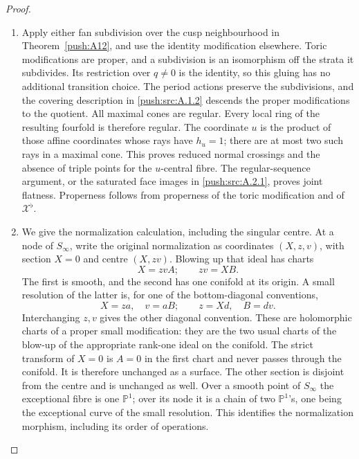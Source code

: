 \begin{proof}
\begin{enumerate}[label=\arabic*.,leftmargin=*]
\item Apply either fan subdivision over the cusp neighbourhood in
Theorem~\ref{push:A12}, and use the identity modification elsewhere.
Toric modifications are proper, and a subdivision is an
isomorphism off the strata it subdivides. Its restriction over
$q\ne0$ is the identity, so this gluing has no additional
transition choice. The period actions preserve the subdivisions,
and the covering description in \ref{push:src:A.1.2} descends the proper
modifications to the quotient. All maximal cones are regular.
Every local ring of the resulting fourfold is therefore regular.
The coordinate $u$ is the product of those affine coordinates
whose rays have $h_u=1$; there are at most two such rays in a
maximal cone. This proves reduced normal crossings and the absence
of triple points for the $u$-central fibre. The regular-sequence
argument, or the saturated face images in \ref{push:src:A.2.1}, proves joint
flatness. Properness follows from properness of the toric
modification and of $\mathcal X^\flat$.

\item We give the normalization calculation, including the singular
centre. At a node of $S_\infty$, write the original normalization
as coordinates $(X,z,v)$, with section $X=0$ and centre
$(X,zv)$. Blowing up that ideal has charts
\[
 X=zvA;\qquad zv=XB.
\]
The first is smooth, and the second has one conifold at its
origin. A small resolution of the latter is, for one of the
bottom-diagonal conventions,
\[
 X=za,\quad v=aB;\qquad z=Xd,\quad B=dv.
\]
Interchanging $z,v$ gives the other diagonal convention. These
are holomorphic charts of a proper small modification: they are
the two usual charts of the blow-up of the appropriate rank-one
ideal on the conifold. The strict transform of $X=0$ is $A=0$
in the first chart and never passes through the conifold. It is
therefore unchanged as a surface. The other section is disjoint
from the centre and is unchanged as well. Over a smooth point
of $S_\infty$ the exceptional fibre is one $\mathbb P^1$;
over its node it is a chain of two $\mathbb P^1$'s, one being
the exceptional curve of the small resolution. This identifies
the normalization morphism, including its order of operations.


\end{enumerate}
\end{proof}
